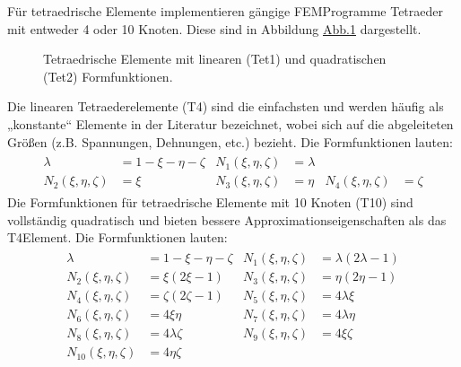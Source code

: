 \documentclass[letterpaper,10pt,german]{jupyterBook}
\let\sphinxpxdimen\pdfpxdimen\else\newdimen\sphinxpxdimen
\begin{document}
\sphinxAtStartPar
Für tetraedrische Elemente implementieren gängige FEM\sphinxhyphen{}Programme Tetraeder mit entweder 4 oder 10 Knoten. Diese sind in Abbildung \hyperref[\detokenize{chapters/chapter3/Ansatzfunktionen:tetraelements}]{Abb.\@ \ref{\detokenize{chapters/chapter3/Ansatzfunktionen:tetraelements}}} dargestellt.

\begin{figure}[htbp]
\centering
\capstart

\noindent\sphinxincludegraphics[width=500\sphinxpxdimen]{{TetElements}.png}
\caption{Tetraedrische Elemente mit linearen (Tet1) und quadratischen (Tet2) Formfunktionen.}\label{\detokenize{chapters/chapter3/Ansatzfunktionen:tetraelements}}\end{figure}

\sphinxAtStartPar
Die linearen Tetraederelemente (T4) sind die einfachsten und werden häufig als „konstante“ Elemente in der Literatur bezeichnet, wobei sich auf die abgeleiteten Größen (z.B. Spannungen, Dehnungen, etc.) bezieht. Die Formfunktionen lauten:
\begin{equation}\label{equation:chapters/chapter3/Ansatzfunktionen:3D_ShapeFunctions_T4}
\begin{split}\begin{align}
\lambda &= 1 - \xi - \eta - \zeta & N_1(\xi ,\eta ,\zeta ) &= \lambda \\
N_2(\xi ,\eta ,\zeta ) &= \xi & N_3(\xi ,\eta ,\zeta ) &= \eta & N_4(\xi ,\eta ,\zeta ) &= \zeta
\end{align}\end{split}
\end{equation}
\sphinxAtStartPar
Die Formfunktionen für tetraedrische Elemente mit 10 Knoten (T10) sind vollständig quadratisch und bieten bessere Approximationseigenschaften als das T4\sphinxhyphen{}Element. Die Formfunktionen lauten:
\begin{equation}\label{equation:chapters/chapter3/Ansatzfunktionen:3D_ShapeFunctions_T10}
\begin{split}\begin{align}
\lambda &= 1 - \xi - \eta - \zeta & N_1(\xi ,\eta ,\zeta ) &= \lambda (2\lambda - 1) \\
N_2(\xi ,\eta ,\zeta ) &= \xi (2\xi - 1) & N_3(\xi ,\eta ,\zeta ) &= \eta (2\eta - 1) \\
N_4(\xi ,\eta ,\zeta ) &= \zeta (2\zeta - 1) & N_5(\xi ,\eta ,\zeta ) &= 4\lambda \xi \\
N_6(\xi ,\eta ,\zeta ) &= 4\xi \eta & N_7(\xi ,\eta ,\zeta ) &= 4\lambda \eta \\
N_8(\xi ,\eta ,\zeta ) &= 4\lambda \zeta & N_9(\xi ,\eta ,\zeta ) &= 4\xi \zeta \\
N_{10}(\xi ,\eta ,\zeta ) &= 4\eta \zeta
\end{align}\end{split}
\end{equation}
\sphinxstepscope
\end{document}
